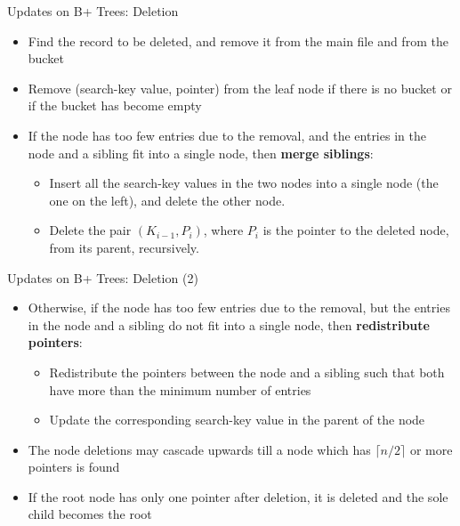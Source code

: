 \documentclass[aspectratio=169, xcolor=dvipsnames]{beamer}
\begin{document}
\begin{frame}{Updates on B+ Trees: Deletion}
    \begin{itemize}[<+->]
        \item Find the record to be deleted, and remove it from the main file and from the bucket
        \item Remove (search-key value, pointer) from the leaf node if there is no bucket or if the bucket has become empty
        \item If the node has too few entries due to the removal, and the entries in the node and a sibling fit into a single node, then \textbf{merge siblings}:
        \begin{itemize}
            \item Insert all the search-key values in the two nodes into a single node (the one on the left), and delete the other node.
            \item Delete the pair $(K_{i-1}, P_i)$, where $P_i$ is the pointer to the deleted node, from its parent, recursively.
        \end{itemize}
    \end{itemize}
\end{frame}

\begin{frame}{Updates on B+ Trees: Deletion (2)}
    \begin{itemize}[<+->]
        \item Otherwise, if the node has too few entries due to the removal, but the entries in the node and a sibling do not fit into a single node, then \textbf{redistribute pointers}:
        \begin{itemize}
            \item Redistribute the pointers between the node and a sibling such that both have more than the minimum number of entries
            \item Update the corresponding search-key value in the parent of the node
        \end{itemize}
        \item The node deletions may cascade upwards till a node which has $\lceil n/2 \rceil$ or more pointers is found
        \item If the root node has only one pointer after deletion, it is deleted and the sole child becomes the root
    \end{itemize}
\end{frame}
\end{document}
